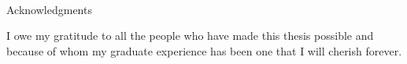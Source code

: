 
\renewcommand{\baselinestretch}{2}
\small\normalsize
\hbox{\ }

\vspace{-.65in}

\begin{center}
\large{Acknowledgments}
\end{center}

\vspace{1ex}

I owe my gratitude to all the people who have made this thesis possible and because of whom my graduate experience has been one that I will cherish forever.
